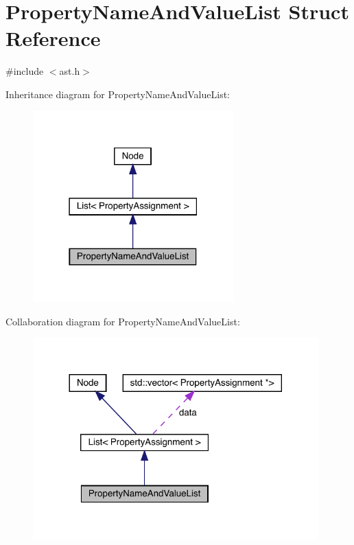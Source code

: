 \hypertarget{struct_property_name_and_value_list}{}\section{Property\+Name\+And\+Value\+List Struct Reference}
\label{struct_property_name_and_value_list}


{\ttfamily \#include $<$ast.\+h$>$}



Inheritance diagram for Property\+Name\+And\+Value\+List\+:\nopagebreak
\begin{figure}[H]
\begin{center}
\leavevmode
\includegraphics[width=219pt]{struct_property_name_and_value_list__inherit__graph}
\end{center}
\end{figure}


Collaboration diagram for Property\+Name\+And\+Value\+List\+:\nopagebreak
\begin{figure}[H]
\begin{center}
\leavevmode
\includegraphics[width=312pt]{struct_property_name_and_value_list__coll__graph}
\end{center}
\end{figure}
